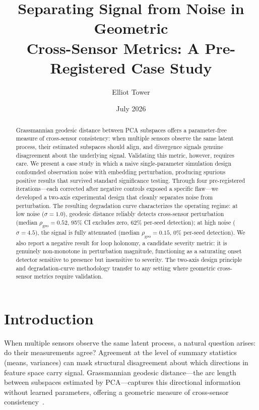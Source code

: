 \documentclass[11pt]{article}
\title{Separating Signal from Noise in Geometric\\
  Cross-Sensor Metrics: A Pre-Registered Case Study}
\author{Elliot Tower}
\date{July 2026}
\newcommand{\rhogeo}{\rho_\mathrm{geo}}
\begin{document}
\linenumbers
\maketitle

\begin{abstract}
Grassmannian geodesic distance between PCA subspaces offers a
parameter-free measure of cross-sensor consistency: when multiple
sensors observe the same latent process, their estimated subspaces
should align, and divergence signals genuine disagreement about the
underlying signal.  Validating this metric, however, requires care.
We present a case study in which a naive single-parameter simulation
design confounded observation noise with embedding perturbation,
producing spurious positive results that survived standard
significance testing.  Through four pre-registered iterations---each
corrected after negative controls exposed a specific flaw---we
developed a two-axis experimental design that cleanly separates
noise from perturbation.  The resulting degradation curve
characterizes the operating regime: at low noise
($\sigma = 1.0$), geodesic distance reliably detects cross-sensor
perturbation (median $\rhogeo = 0.52$, 95\% CI excludes zero,
62\% per-seed detection); at high noise ($\sigma = 4.5$), the
signal is fully attenuated (median $\rhogeo = 0.15$, 0\%
per-seed detection).  We also report a negative result for loop
holonomy, a candidate severity metric: it is genuinely
non-monotone in perturbation magnitude, functioning as a
saturating onset detector sensitive to presence but insensitive
to severity.  The
two-axis design principle and degradation-curve methodology
transfer to any setting where geometric cross-sensor metrics
require validation.
\end{abstract}

\section{Introduction}
\label{sec:intro}

When multiple sensors observe the same latent process, a natural
question arises: do their measurements agree?  Agreement at the
level of summary statistics (means, variances) can mask structural
disagreement about which directions in feature space carry signal.
Grassmannian geodesic distance---the arc length between subspaces
estimated by PCA---captures this directional information without
learned parameters, offering a geometric measure of cross-sensor
consistency~\citep{edelman1998geometry, chikuse2003statistics}.
\end{document}
